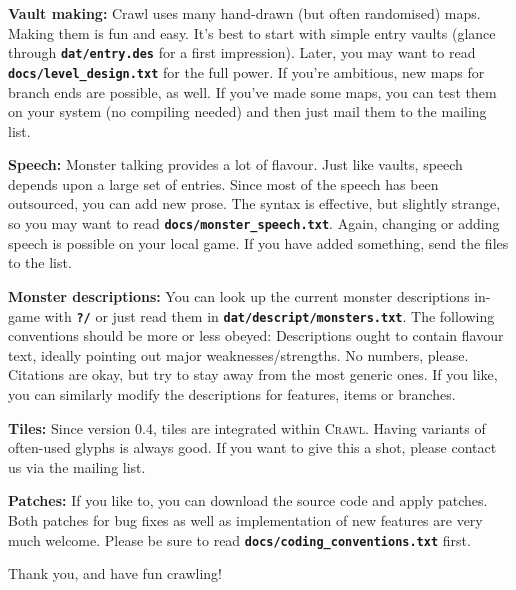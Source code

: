 \documentclass[a4paper,10pt]{article}
\newcommand{\key}[1]{{{\texttt{\textbf{#1}}}}} %
\newcommand{\crawl}{\textsc{Crawl}}
\newcommand{\para}{\vspace{1.5ex}}
\begin{document}
\textbf{Vault making:}
Crawl uses many hand-drawn (but often randomised) maps. Making them is fun 
and easy. It's best to start with simple entry vaults (glance through 
\key{dat/entry.des} for a first impression). Later, you may want to read 
\key{docs/level\_design.txt} for the full power. If you're ambitious, new 
maps for branch ends are possible, as well.
If you've made some maps, you can test them on your system (no compiling 
needed) and then just mail them to the mailing list.

\para

\textbf{Speech:}
Monster talking provides a lot of flavour. Just like vaults, speech depends 
upon a large set of entries. Since most of the speech has been outsourced, 
you can add new prose. The syntax is effective, but slightly strange, so you 
may want to read \key{docs/monster\_speech.txt}.
Again, changing or adding speech is possible on your local game. If you 
have added something, send the files to the list.

\para

\textbf{Monster descriptions:}
You can look up the current monster descriptions in-game with \key{?/} or 
just read them in \key{dat/descript/monsters.txt}. The following conventions 
should be more or less obeyed: Descriptions ought to contain flavour text, 
ideally pointing out major weaknesses/strengths. No numbers, please. 
Citations are okay, but try to stay away from the most generic ones.
If you like, you can similarly modify the descriptions for features, items or
branches.

\para

\textbf{Tiles:}
Since version 0.4, tiles are integrated within \crawl. Having variants of 
often-used glyphs is always good. If you want to give this a shot, please 
contact us via the mailing list.

\para

\textbf{Patches:}
If you like to, you can download the source code and apply patches. Both 
patches for bug fixes as well as implementation of new features are very 
much welcome. Please be sure to read \key{docs/coding\_conventions.txt} first.

\para\para\para

Thank you, and have fun crawling!
\end{document}
